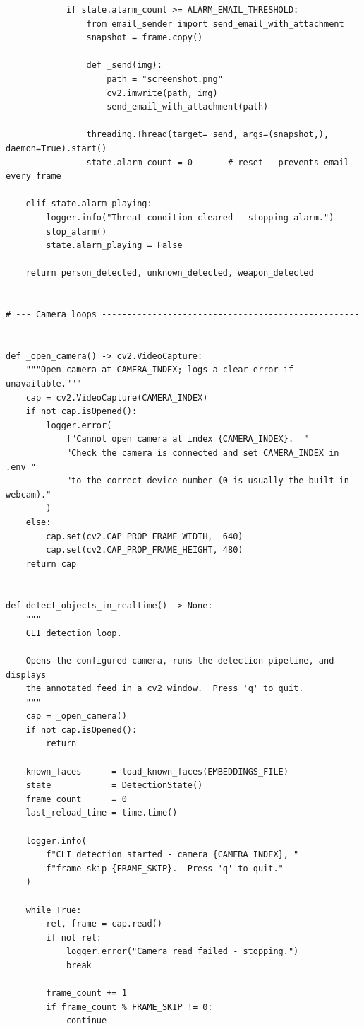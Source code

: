 \documentclass[12pt,a4paper]{report}
\begin{document}
\begin{lstlisting}
            if state.alarm_count >= ALARM_EMAIL_THRESHOLD:
                from email_sender import send_email_with_attachment
                snapshot = frame.copy()

                def _send(img):
                    path = "screenshot.png"
                    cv2.imwrite(path, img)
                    send_email_with_attachment(path)

                threading.Thread(target=_send, args=(snapshot,), daemon=True).start()
                state.alarm_count = 0       # reset - prevents email every frame

    elif state.alarm_playing:
        logger.info("Threat condition cleared - stopping alarm.")
        stop_alarm()
        state.alarm_playing = False

    return person_detected, unknown_detected, weapon_detected


# --- Camera loops -------------------------------------------------------------

def _open_camera() -> cv2.VideoCapture:
    """Open camera at CAMERA_INDEX; logs a clear error if unavailable."""
    cap = cv2.VideoCapture(CAMERA_INDEX)
    if not cap.isOpened():
        logger.error(
            f"Cannot open camera at index {CAMERA_INDEX}.  "
            "Check the camera is connected and set CAMERA_INDEX in .env "
            "to the correct device number (0 is usually the built-in webcam)."
        )
    else:
        cap.set(cv2.CAP_PROP_FRAME_WIDTH,  640)
        cap.set(cv2.CAP_PROP_FRAME_HEIGHT, 480)
    return cap


def detect_objects_in_realtime() -> None:
    """
    CLI detection loop.

    Opens the configured camera, runs the detection pipeline, and displays
    the annotated feed in a cv2 window.  Press 'q' to quit.
    """
    cap = _open_camera()
    if not cap.isOpened():
        return

    known_faces      = load_known_faces(EMBEDDINGS_FILE)
    state            = DetectionState()
    frame_count      = 0
    last_reload_time = time.time()

    logger.info(
        f"CLI detection started - camera {CAMERA_INDEX}, "
        f"frame-skip {FRAME_SKIP}.  Press 'q' to quit."
    )

    while True:
        ret, frame = cap.read()
        if not ret:
            logger.error("Camera read failed - stopping.")
            break

        frame_count += 1
        if frame_count % FRAME_SKIP != 0:
            continue


\end{lstlisting}
\end{document}
